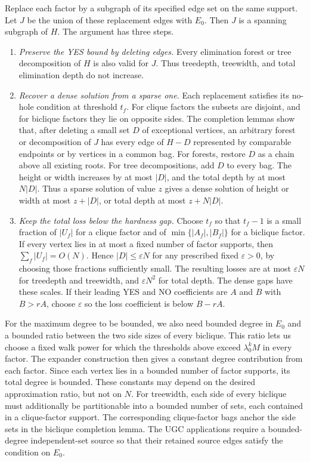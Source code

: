Replace each factor by a subgraph of its specified edge set on
the same support. Let $J$ be the union of these replacement edges
with $E_0$. Then $J$ is a spanning subgraph of $H$. The argument has
three steps.
\begin{enumerate}
 \item \emph{Preserve the YES bound by deleting edges.}
   Every elimination forest or tree decomposition of $H$ is also
   valid for $J$. Thus treedepth, treewidth, and total elimination
   depth do not increase.
 \item \emph{Recover a dense solution from a sparse one.}
   Each replacement satisfies its no-hole condition at threshold
   $t_f$. For clique factors the subsets are disjoint, and for
   biclique factors they lie on opposite sides.
   The completion lemmas show that, after deleting a small set $D$
   of exceptional vertices, an arbitrary forest or decomposition
   of $J$ has every edge of $H-D$ represented by comparable
   endpoints or by vertices in a common bag. For forests,
   restore $D$ as a chain above all existing roots. For tree
   decompositions, add $D$ to every bag. The height or width
   increases by at most $|D|$, and the total depth by at most
   $N|D|$. Thus a sparse solution of value $z$ gives a dense
   solution of height or width at most $z+|D|$, or total depth at
   most $z+N|D|$.
 \item \emph{Keep the total loss below the hardness gap.}
   Choose $t_f$ so that $t_f-1$ is a small fraction of $|U_f|$
   for a clique factor and of $\min\{|A_f|,|B_f|\}$ for a
   biclique factor. If every vertex lies in at most a fixed number
   of factor supports, then $\sum_f |U_f|=O(N)$. Hence
   $|D|\le\varepsilon N$ for any prescribed fixed
   $\varepsilon>0$, by choosing those fractions sufficiently small.
   The resulting losses are at most $\varepsilon N$ for treedepth
   and treewidth, and $\varepsilon N^2$ for total depth. The dense
   gaps have these scales. If their leading YES and NO coefficients
   are $A$ and $B$ with $B>rA$, choose $\varepsilon$ so the loss
   coefficient is below $B-rA$.
\end{enumerate}

For the maximum degree to be bounded, we also need bounded degree
in $E_0$ and a bounded ratio between the two side sizes of every
biclique. This ratio lets us choose a fixed walk power for which
the thresholds above exceed $\lambda_0^kM$ in every factor. The
expander construction then gives a constant degree contribution
from each factor. Since each vertex lies in a bounded number of
factor supports, its total degree is bounded. These constants may
depend on the desired approximation ratio, but not on $N$. For
treewidth, each
side of every biclique must additionally be partitionable into a
bounded number of sets, each contained in a clique-factor support.
The corresponding clique-factor bags anchor the side sets in the
biclique completion lemma.
The \textup{UGC} applications require a bounded-degree independent-set source so
that their retained source edges satisfy the condition on $E_0$.

